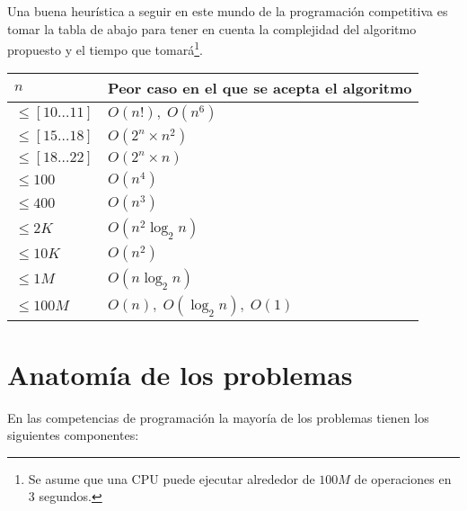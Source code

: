 Una buena heurística a seguir en este mundo de la programación competitiva es tomar la tabla de
abajo para tener en cuenta la complejidad del algoritmo propuesto y el tiempo que tomará\footnote{
    Se asume que una CPU puede ejecutar alrededor de $100M$ de operaciones en 3 segundos.
}.
\begin{table}[H]
\centering
\begin{tabular}{l|l}
\hline
$n$                   & Peor caso en el que se acepta el algoritmo  \\ \hline
$\leq [10 \ldots 11]$ & $O(n!), \; O(n^6)$                          \\
$\leq [15 \ldots 18]$ & $O(2^n \times n^2)$                         \\
$\leq [18 \ldots 22]$ & $O(2^n \times n)$                           \\
$\leq 100$            & $O(n^4)$                                    \\
$\leq 400$            & $O(n^3)$                                    \\
$\leq 2K$             & $O(n^2 \log_2 n)$                           \\
$\leq 10K$            & $O(n^2)$                                    \\
$\leq 1M$             & $O(n \log_2 n)$                             \\
$\leq 100M$           & $O(n), \; O(\log_2 n), \; O(1)$             \\ \hline
\end{tabular}
\label{cap5:tabla:complejidades}
\end{table}

\section{Anatomía de los problemas}

En las competencias de programación la mayoría de los problemas tienen los siguientes componentes:

